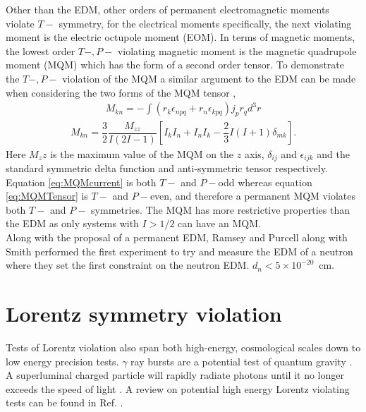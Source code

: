 \documentclass[10pt,a4paper, twoside, openright]{report}
\begin{document}
Other than the EDM, other orders of permanent electromagnetic moments violate $T-$ symmetry, for the electrical moments specifically, the next violating moment is the electric octupole moment (EOM). In terms of magnetic moments, the lowest order $T-,P-$ violating magnetic moment is the magnetic quadrupole moment (MQM) which has the form of a second order tensor. To demonstrate the $T-,P-$ violation of the MQM a similar argument to the EDM can be made when considering the two forms of the MQM tensor \cite{SFK1984},
\begin{align} \label{eq:MQMcurrent}
M_{kn} = - \int \left( r_k \epsilon_{npq} + r_n\epsilon_{kpq} \right)j_pr_q d^3r
\end{align}
\begin{align} \label{eq:MQMTensor}
M_{kn} = \dfrac{3}{2}\dfrac{M_{zz}}{I(2I-1)}\left[I_{k}I_{n} + I_{n}I_{k} - \dfrac{2}{3}I(I+1)\delta_{mk}\right].
\end{align}
Here $M_zz$ is the maximum value of the MQM on the $z$ axis, $\delta_{ij}$ and $\epsilon_{ijk}$ and the standard symmetric delta function and anti-symmetric tensor respectively. Equation \ref{eq:MQMcurrent} is both $T-$ and $P-$odd whereas equation \ref{eq:MQMTensor} is $T-$ and $P-$even, and therefore a permanent MQM violates both $T-$ and $P-$ symmetries. The MQM has more restrictive properties than the EDM as only systems with $I>1/2$ can have an MQM. \\
\linebreak
Along with the proposal of a permanent EDM, Ramsey and Purcell along with Smith performed the first experiment to try and measure the EDM of a neutron \cite{Smith1957} where they set the first constraint on the neutron EDM. $d_n < 5 \times 10^{-20}$~cm. 
\section{Lorentz symmetry violation} \label{sec:Lorentz}
Tests of Lorentz violation also span both high-energy, cosmological scales down to low energy precision tests. $\gamma$ ray bursts are a potential test of quantum gravity  \cite{Amelino1998}. A superluminal charged particle will rapidly radiate photons until it no longer exceeds the speed of light \cite{Coleman1997}. A review on potential high energy Lorentz violating tests can be found in Ref. \cite{Coleman1999}. 
\end{document}
